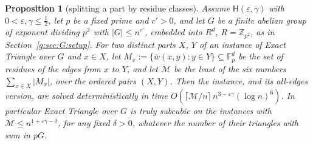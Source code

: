 \documentclass[11pt]{article}
\newtheorem{proposition}[theorem]{Proposition}
\theoremstyle{definition}
\theoremstyle{remark}
\newcommand{\Z}{\mathbb{Z}}
\newcommand{\Fp}{\mathbb{F}_p}
\newcommand{\eps}{\varepsilon}
\newcommand{\Hyp}{\mathsf{H}}
\begin{document}
\begin{proposition}[splitting a part by residue classes]\label{g:prop:tricopy}
Assume $\Hyp(\eps,\gamma)$ with $0<\eps,\gamma\le\frac12$, let $p$ be a fixed prime and $c'>0$, and let $G$ be a finite abelian group of exponent dividing $p^2$ with $|G|\le n^{c'}$, embedded into $R^d$, $R=\Z_{p^2}$, as in Section~\ref{g:sec:G:setup}. For two distinct parts $X$, $Y$ of an instance of Exact Triangle over $G$ and $x\in X$, let $M_x:=\{\bar w(x,y):y\in Y\}\subseteq\Fp^d$ be the set of residues of the edges from $x$ to $Y$, and let $\mathcal M$ be the least of the six numbers $\sum_{x\in X}|M_x|$, over the ordered pairs $(X,Y)$. Then the instance, and its all-edges version, are solved deterministically in time $O(\lceil\mathcal M/n\rceil\,n^{3-\eps\gamma}(\log n)^6)$. In particular Exact Triangle over $G$ is truly subcubic on the instances with $\mathcal M\le n^{1+\eps\gamma-\delta}$, for any fixed $\delta>0$, whatever the number of their triangles with sum in $pG$.
\end{proposition}
\end{document}
